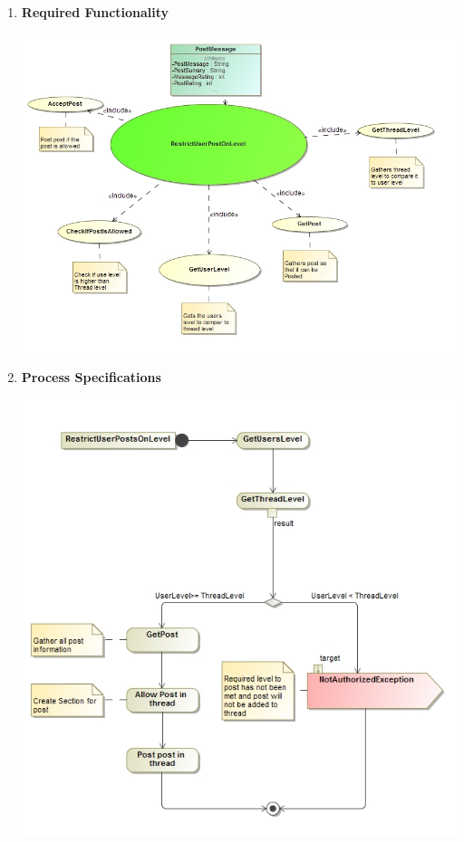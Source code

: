 \documentclass[11pt]{article}
\begin{document}
\begin{enumerate}
		 \item	\textbf{Required Functionality}
		 	  		\begin{center}
		 	  			\includegraphics[scale=0.5]{Diagrams/B1 UseCase.png}
		 	  		\end{center}
		\newpage
		 \item \textbf{Process Specifications}
		 	  		\begin{center}
		 	  			\includegraphics[scale=0.5]{Diagrams/B1 Activity.png}
		 	  		\end{center}
		 
			
	\end{enumerate}
 \newpage
\end{document}

